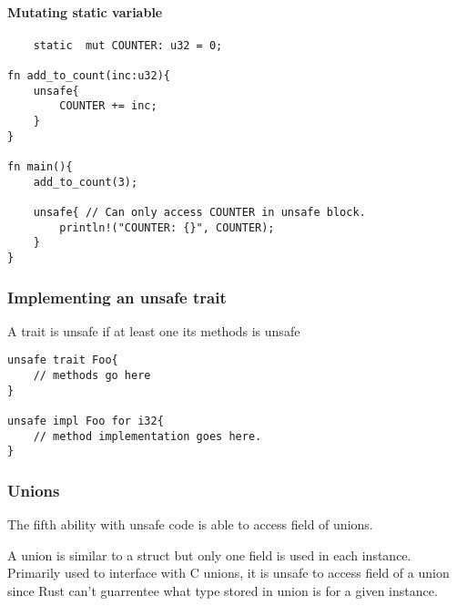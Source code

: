 \paragraph*{Mutating static variable}\begin{lstlisting}
    static  mut COUNTER: u32 = 0;

fn add_to_count(inc:u32){
    unsafe{
        COUNTER += inc;
    }
}

fn main(){
    add_to_count(3);
    
    unsafe{ // Can only access COUNTER in unsafe block.
        println!("COUNTER: {}", COUNTER);
    }
}
\end{lstlisting}

\subsubsection{Implementing an unsafe trait}
A trait is unsafe if at least one its methods is unsafe

\begin{lstlisting}
unsafe trait Foo{
    // methods go here
}

unsafe impl Foo for i32{
    // method implementation goes here.
}
\end{lstlisting}

\subsubsection{Unions}

The fifth ability with unsafe code is able to access field of unions. 

A union is similar to a struct but only one field is used in each instance. Primarily used to interface with C unions, it is unsafe to access field of a union since Rust can't guarrentee what type stored in union is for a given instance.

